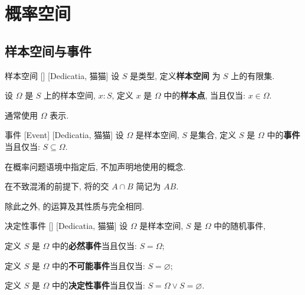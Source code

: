 \documentclass[UTF8]{ctexart}
\begin{document}
\tableofcontents
\newpage

\section{概率空间}

    \subsection{样本空间与事件}

        \begin{dfn}
            {样本空间}
            []
            [Dedicatia, 猫猫]
            设 \(S\) 是类型, 定义\textbf{样本空间} 为 \(S\) 上的有限集. 

            设 \(\Omega\) 是 \(S\) 上的样本空间, \(x:S\), 定义 \(x\) 是 \(\Omega\) 中的\textbf{样本点}, 当且仅当: \(x\in\Omega\). 
        \end{dfn}

        \begin{rmk}
            [猫猫]
            通常使用 \(\Omega\) 表示. 
        \end{rmk}

        \begin{dfn}
            [Event]
            {事件}
            [Event]
            [Dedicatia, 猫猫]
            设 \(\Omega\) 是样本空间, \(S\) 是集合, 定义 \(S\) 是 \(\Omega\) 中的\textbf{事件}当且仅当: \(S\subseteq\Omega\). 
        \end{dfn}

        \begin{rmk}
            [猫猫]
            在概率问题语境中指定 后, 不加声明地使用 的概念. 
        \end{rmk}

        \begin{rmk}
            [猫猫]
            在不致混淆的前提下, 将 的交 \(A\cap B\) 简记为 \(AB\). 

            除此之外,  的运算及其性质与 完全相同. 
        \end{rmk}

        \begin{dfn}
            []
            {决定性事件}
            []
            [Dedicatia, 猫猫]
            设 \(\Omega\) 是样本空间, \(S\) 是 \(\Omega\) 中的随机事件, 

            定义 \(S\) 是 \(\Omega\) 中的\textbf{必然事件}当且仅当: \(S=\Omega\); 

            定义 \(S\) 是 \(\Omega\) 中的\textbf{不可能事件}当且仅当: \(S=\varnothing\); 

            定义 \(S\) 是 \(\Omega\) 中的\textbf{决定性事件}当且仅当: \(S=\Omega\lor S=\varnothing\). 
        \end{dfn}
\end{document}
